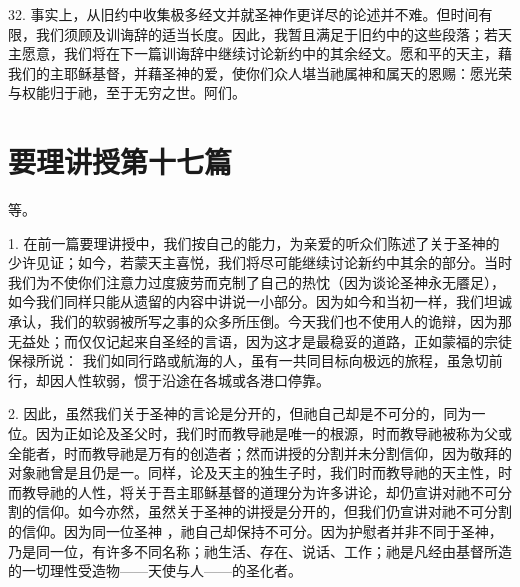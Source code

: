 32. 事实上，从旧约中收集极多经文并就圣神作更详尽的论述并不难。但时间有限，我们须顾及训诲辞的适当长度。因此，我暂且满足于旧约中的这些段落；若天主愿意，我们将在下一篇训诲辞中继续讨论新约中的其余经文。愿和平的天主，藉我们的主耶稣基督，并藉圣神的爱，使你们众人堪当祂属神和属天的恩赐：愿光荣与权能归于祂，至于无穷之世。阿们。\par



\section{要理讲授第十七篇}

\par

\par

等。\par

1. 在前一篇要理讲授中，我们按自己的能力，为亲爱的听众们陈述了关于圣神的少许见证；如今，若蒙天主喜悦，我们将尽可能继续讨论新约中其余的部分。当时我们为不使你们注意力过度疲劳而克制了自己的热忱（因为谈论圣神永无餍足），如今我们同样只能从遗留的内容中讲说一小部分。因为如今和当初一样，我们坦诚承认，我们的软弱被所写之事的众多所压倒。今天我们也不使用人的诡辩，因为那无益处；而仅仅记起来自圣经的言语，因为这才是最稳妥的道路，正如蒙福的宗徒保禄所说：  我们如同行路或航海的人，虽有一共同目标向极远的旅程，虽急切前行，却因人性软弱，惯于沿途在各城或各港口停靠。\par

2. 因此，虽然我们关于圣神的言论是分开的，但祂自己却是不可分的，同为一位。因为正如论及圣父时，我们时而教导祂是唯一的根源，时而教导祂被称为父或全能者，时而教导祂是万有的创造者；然而讲授的分割并未分割信仰，因为敬拜的对象祂曾是且仍是一。同样，论及天主的独生子时，我们时而教导祂的天主性，时而教导祂的人性，将关于吾主耶稣基督的道理分为许多讲论，却仍宣讲对祂不可分割的信仰。如今亦然，虽然关于圣神的讲授是分开的，但我们仍宣讲对祂不可分割的信仰。因为同一位圣神 ，祂自己却保持不可分。因为护慰者并非不同于圣神，乃是同一位，有许多不同名称；祂生活、存在、说话、工作；祂是凡经由基督所造的一切理性受造物——天使与人——的圣化者。\par

